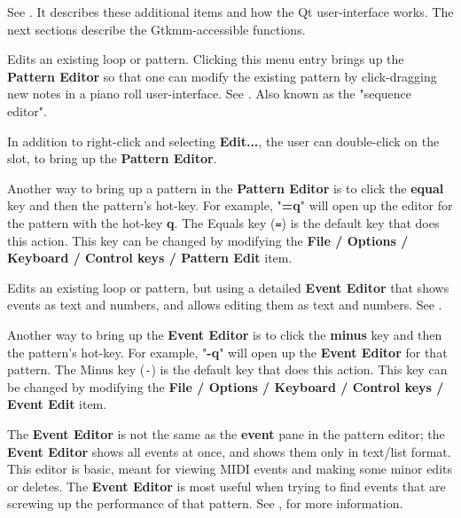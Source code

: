    See .
   It describes these additional items and how the Qt user-interface works.
   The next sections describe the Gtkmm-accessible functions.

   \setcounter{ItemCounter}{0}      %

   Edits an existing loop or pattern.
   Clicking this menu entry brings up the \textbf{Pattern Editor}
   so that one can modify the existing pattern by click-dragging new notes in a
   piano roll user-interface.
   See .
   Also known as the "sequence editor".

   In addition to right-click and selecting \textbf{Edit...}, the user can
   double-click on the slot, to bring up the \textbf{Pattern Editor}.

   Another way to bring up a pattern in the 
   \textbf{Pattern Editor} is to
   click the \textbf{equal} key and then the pattern's hot-key.
   For example, "\textbf{=q}" will open up the editor for the pattern with the
   hot-key \textbf{q}.
   The Equals key (\texttt{=}) is the default key that does this action.
   This key can be changed by modifying the
   \textbf{File / Options / Keyboard / Control keys / Pattern Edit} item.

   Edits an existing loop or pattern, but using a detailed \textbf{Event Editor}
   that shows events as text and numbers, and allows editing them as text and
   numbers.
   See .

   Another way to bring up the \textbf{Event Editor} is to
   click the \textbf{minus} key and then the pattern's hot-key.
   For example, "\textbf{-q}" will open up the \textbf{Event Editor}
   for that pattern.
   The Minus key (\texttt{-}) is the default key that does this action.
   This key can be changed by modifying the
   \textbf{File / Options / Keyboard / Control keys / Event Edit} item.

   The \textbf{Event Editor}
   is not the same as the \textbf{event} pane in the pattern
   editor; the \textbf{Event Editor} shows all events at once, and shows them
   only in text/list format.  This editor is basic, meant for viewing
   MIDI events and making some minor edits or deletes.
   The \textbf{Event Editor} is most useful when trying to find events
   that are screwing up the performance of that pattern.
   See , for more information.

